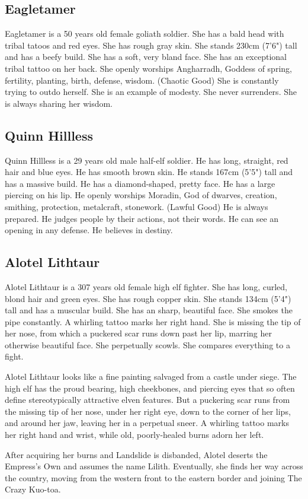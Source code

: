 \subsection{Eagletamer}\label{subsec:eagletamer}
Eagletamer is a 50 years old female goliath soldier.
She has a bald head with tribal tatoos and red eyes.
She has rough gray skin.
She stands 230cm (7'6") tall and has a beefy build.
She has a soft, very bland face.
She has an exceptional tribal tattoo on her back.
She openly worships Angharradh, Goddess of spring, fertility, planting, birth, defense, wisdom. (Chaotic Good)
She is constantly trying to outdo herself.
She is an example of modesty.
She never surrenders.
She is always sharing her wisdom.

\subsection{Quinn Hillless}\label{subsec:quinn}
Quinn Hillless is a 29 years old male half-elf soldier.
He has long, straight, red hair and blue eyes.
He has smooth brown skin.
He stands 167cm (5'5") tall and has a massive build.
He has a diamond-shaped, pretty face.
He has a large piercing on his lip.
He openly worships Moradin, God of dwarves, creation, smithing, protection, metalcraft, stonework. (Lawful Good)
He is always prepared.
He judges people by their actions, not their words.
He can see an opening in any defense.
He believes in destiny.

\subsection{Alotel Lithtaur}\label{subsec:alotel}

Alotel Lithtaur is a 307 years old female high elf fighter.
She has long, curled, blond hair and green eyes.
She has rough copper skin.
She stands 134cm (5'4") tall and has a muscular build.
She has an sharp, beautiful face.
She smokes the pipe constantly.
A whirling tattoo marks her right hand.
She is missing the tip of her nose, from which a puckered scar runs down past her lip,
marring her otherwise beautiful face.
She perpetually scowls.
She compares everything to a fight.

\begin{aloud}
  \label{description:alotel}
  Alotel Lithtaur looks like a fine painting salvaged from a castle under siege.
  The high elf has the proud bearing, high cheekbones, and piercing eyes that so often define
    stereotypically attractive elven features.
  But a puckering scar runs from the missing tip of her nose, under her right eye, down to the
  corner of her lips, and around her jaw, leaving her in a perpetual sneer.
  A whirling tattoo marks her right hand and wrist, while old, poorly-healed burns adorn her left.
\end{aloud}

After acquiring her burns and Landslide is disbanded, Alotel deserts the Empress's Own and assumes
  the name Lilith.
Eventually, she finds her way across the country, moving from the western front to the eastern
  border and joining The Crazy Kuo-toa.
